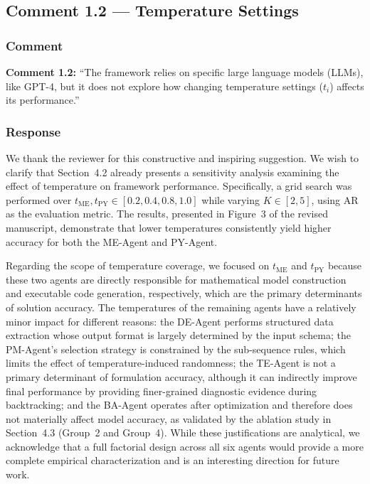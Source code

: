 \documentclass[11pt,a4paper]{article}
\begin{document}
\subsection{Comment 1.2 --- Temperature Settings}

\subsubsection{Comment}

\textbf{Comment 1.2: }``The framework relies on specific large language models (LLMs), like GPT-4, but it does not explore how changing temperature settings ($t_i$) affects its performance.''

\subsubsection{Response}
We thank the reviewer for this constructive and inspiring suggestion. We wish to clarify that Section~4.2 already presents a sensitivity analysis examining the effect of temperature on framework performance. Specifically, a grid search was performed over $t_\text{ME}, t_\text{PY} \in [0.2, 0.4, 0.8, 1.0]$ while varying $K \in [2,5]$, using AR as the evaluation metric. The results, presented in Figure~3 of the revised manuscript, demonstrate that lower temperatures consistently yield higher accuracy for both the ME-Agent and PY-Agent.

Regarding the scope of temperature coverage, we focused on $t_\text{ME}$ and $t_\text{PY}$ because these two agents are directly responsible for mathematical model construction and executable code generation, respectively, which are the primary determinants of solution accuracy. The temperatures of the remaining agents have a relatively minor impact for different reasons: the DE-Agent performs structured data extraction whose output format is largely determined by the input schema; the PM-Agent's selection strategy is constrained by the sub-sequence rules, which limits the effect of temperature-induced randomness; the TE-Agent is not a primary determinant of formulation accuracy, although it can indirectly improve final performance by providing finer-grained diagnostic evidence during backtracking; and the BA-Agent operates after optimization and therefore does not materially affect model accuracy, as validated by the ablation study in Section~4.3 (Group~2 and Group~4). While these justifications are analytical, we acknowledge that a full factorial design across all six agents would provide a more complete empirical characterization and is an interesting direction for future work.
\end{document}

